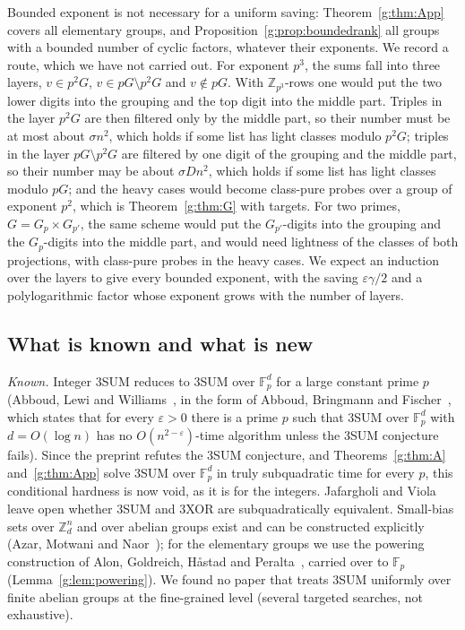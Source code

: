 \documentclass[11pt]{article}
\theoremstyle{definition}
\theoremstyle{remark}
\newcommand{\Z}{\mathbb{Z}}
\newcommand{\Fp}{\mathbb{F}_p}
\newcommand{\eps}{\varepsilon}
\begin{document}
Bounded exponent is not necessary for a uniform saving: Theorem~\ref{g:thm:App} covers all elementary groups, and Proposition~\ref{g:prop:boundedrank} all groups with a bounded number of cyclic factors, whatever their exponents. We record a route, which we have not carried out. For exponent $p^3$, the sums fall into three layers, $v\in p^2G$, $v\in pG\setminus p^2G$ and $v\notin pG$. With $\Z_{p^3}$-rows one would put the two lower digits into the grouping and the top digit into the middle part. Triples in the layer $p^2G$ are then filtered only by the middle part, so their number must be at most about $\sigma n^2$, which holds if some list has light classes modulo $p^2G$; triples in the layer $pG\setminus p^2G$ are filtered by one digit of the grouping and the middle part, so their number may be about $\sigma Dn^2$, which holds if some list has light classes modulo $pG$; and the heavy cases would become class-pure probes over a group of exponent $p^2$, which is Theorem~\ref{g:thm:G} with targets. For two primes, $G=G_p\times G_{p'}$, the same scheme would put the $G_{p'}$-digits into the grouping and the $G_p$-digits into the middle part, and would need lightness of the classes of both projections, with class-pure probes in the heavy cases. We expect an induction over the layers to give every bounded exponent, with the saving $\eps\gamma/2$ and a polylogarithmic factor whose exponent grows with the number of layers.

\subsection{What is known and what is new}\label{g:sec:groupsremarks}

\emph{Known.} Integer 3SUM reduces to 3SUM over $\Fp^d$ for a large constant prime $p$ (Abboud, Lewi and Williams~\cite[Lemma~3.1, Corollary~3.1]{ALW14}, in the form of Abboud, Bringmann and Fischer~\cite[Lemma~3.8]{ABF23}, which states that for every $\eps>0$ there is a prime $p$ such that 3SUM over $\mathbb F_p^d$ with $d=O(\log n)$ has no $O(n^{2-\eps})$-time algorithm unless the 3SUM conjecture fails). Since the preprint refutes the 3SUM conjecture, and Theorems~\ref{g:thm:A} and~\ref{g:thm:App} solve 3SUM over $\Fp^d$ in truly subquadratic time for every $p$, this conditional hardness is now void, as it is for the integers. Jafargholi and Viola~\cite{JV16} leave open whether 3SUM and 3XOR are subquadratically equivalent. Small-bias sets over $\Z_d^n$ and over abelian groups exist and can be constructed explicitly (Azar, Motwani and Naor~\cite{AMN98}); for the elementary groups we use the powering construction of Alon, Goldreich, H\aa stad and Peralta~\cite[Proposition~3]{AGHP92}, carried over to $\Fp$ (Lemma~\ref{g:lem:powering}). We found no paper that treats 3SUM uniformly over finite abelian groups at the fine-grained level (several targeted searches, not exhaustive).
\end{document}
